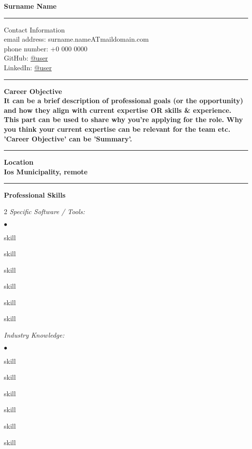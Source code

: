 \documentclass[oneside,final,10pt]{extreport}
\newenvironment{compactlist}{
	\begin{list}{{$\bullet$}}{
		\setlength\leftmargin{0.4cm}
		\setlength\partopsep{0pt}
		\setlength\parskip{0pt}
		\setlength\parsep{0pt}
		\setlength\topsep{0pt}
		\setlength\itemsep{0pt}
	}
}{
	\end{list}
}
\begin{document}
\bfseries
Surname Name \\
\rule{\textwidth}{0.4pt}
Contact Information \\
\noindent
\mdseries
email address: 
surname.nameATmaildomain.com \\
phone number: 
+0 000 0000 \\
GitHub:
\href{https://github.com/user}{@user} \\
LinkedIn:
\href{https://www.linkedin.com/in/username}{@user} \\
\rule{\textwidth}{0.4pt}

\bfseries
Career Objective \\
\mdseries
It can be a brief description of professional goals (or the opportunity) and how they align with current expertise OR skills \& experience. \\
This part can be used to share why you're applying for the role. Why you think your current expertise can be relevant for the team etc. \\
'Career Objective' can be 'Summary'. \\[5pt]
\rule{\textwidth}{0.4pt}

\bfseries
Location \\
\mdseries
Ios Municipality, remote \\
\rule{\textwidth}{0.4pt}

\bfseries
Professional Skills
\mdseries
\begin{multicols}{2}
\textsl{Specific Software / Tools:}
	 \begin{compactlist}
		 \item skill
		 \item skill
		 \item skill
		 \item skill
		 \item skill
		 \item skill
	 \end{compactlist}
\textsl{Industry Knowledge:}
	 \begin{compactlist}
		 \item skill
		 \item skill
		 \item skill
		 \item skill
		 \item skill
		 \item skill
	 \end{compactlist}
\end{multicols}
\end{document}

